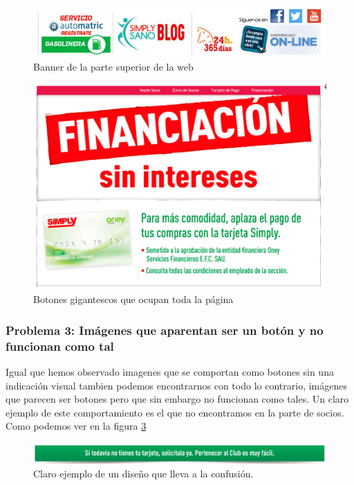 \documentclass[a4paper,11pt]{article}
\begin{document}
\begin{figure}[h!]
 \centering
 \includegraphics[scale=0.5]{bannerarriba.png}
 \caption{Banner de la parte superior de la web}
 \label{fig:bannerarriba}
\end{figure}

\begin{figure}[h!]
 \centering
 \includegraphics[scale=0.5]{botoncamuflado.png}
 \caption{Botones gigantescos que ocupan toda la página}
 \label{fig:pagcomplbot}
\end{figure}

\subsubsection{Problema 3: Imágenes que aparentan ser un botón y no funcionan como tal}
Igual que hemos observado imagenes que se comportan como botones sin una indicación visual tambien podemos encontrarnos con todo lo contrario, imágenes que parecen ser botones pero que sin embargo no funcionan como tales. Un claro ejemplo de este comportamiento es el que no encontramos en la parte de socios. Como podemos ver en la figura \ref{fig:botonnoboton}

\begin{figure}[h!]
 \centering
 \includegraphics[scale=0.4]{botonquenoesboton.png}
 \caption{Claro ejemplo de un diseño que lleva a la confusión.}
 \label{fig:botonnoboton}
\end{figure}
\end{document}
